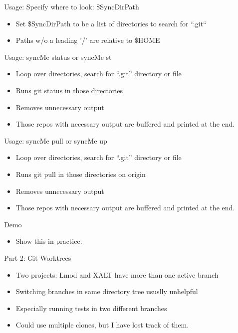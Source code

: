 \documentclass{beamer}
\begin{document}
\begin{frame}{Usage: Specify where to look: \$SyncDirPath}
  \begin{itemize}
    \item Set \$SyncDirPath to be a list of directories to search for
      ``.git``
    \item Paths w/o a leading '/' are relative to \$HOME
  \end{itemize}
\end{frame}

\begin{frame}{Usage: syncMe status or syncMe st}
  \begin{itemize}
    \item Loop over directories, search for ``.git'' directory or file
    \item Runs git status in those directories
    \item Removes unnecessary output
    \item Those repos with necessary output are buffered and printed
      at the end.
  \end{itemize}
\end{frame}

\begin{frame}{Usage: syncMe pull or syncMe up}
  \begin{itemize}
    \item Loop over directories, search for ``.git'' directory or file
    \item Runs git pull in those directories on origin
    \item Removes unnecessary output
    \item Those repos with necessary output are buffered and printed
      at the end.
  \end{itemize}
\end{frame}


\begin{frame}{Demo}
  \begin{itemize}
    \item Show this in practice.
  \end{itemize}
\end{frame}

\begin{frame}{Part 2: Git Worktrees}
  \begin{itemize}
    \item Two projects: Lmod and XALT have more than one active branch
    \item Switching branches in same directory tree ususlly unhelpful
    \item Especially running tests in two different branches
    \item Could use multiple clones, but I have lost track of them.
  \end{itemize}
\end{frame}
\end{document}
